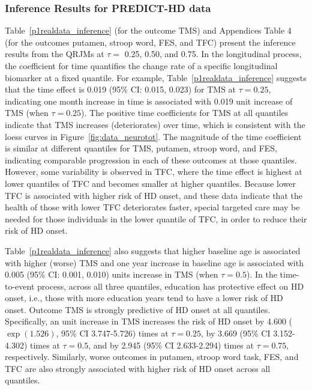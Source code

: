 \subsubsection{Inference Results for PREDICT-HD data}\label{sec:data_results}
Table~\ref{p1realdata_inference} (for the outcome TMS) and Appendices Table 4 (for the outcomes putamen, stroop word, FES, and TFC) present the inference results from the QRJMs at $\tau=$ 0.25, 0.50, and 0.75. In the longitudinal process, the coefficient for time quantifies the change rate of a specific longitudinal biomarker at a fixed quantile. For example, Table~\ref{p1realdata_inference} suggests that the time effect is 0.019 (95\% CI: 0.015, 0.023) for TMS at $\tau=0.25$, indicating one month increase in time is associated with 0.019 unit increase of TMS (when $\tau=0.25$). The positive time coefficients for TMS at all quantiles indicate that TMS increases (deteriorates) over time, which is consistent with the loess curves in Figure~\ref{fig:data_neurotot}. The magnitude of the time coefficient is similar at different quantiles for TMS, putamen, stroop word, and FES, indicating comparable progression in each of these outcomes at those quantiles. However, some variability is observed in TFC, where the time effect is highest at lower quantiles of TFC and becomes smaller at higher quantiles. Because lower TFC is associated with higher risk of HD onset, and these data indicate that the health of those with lower TFC deteriorates faster, special targeted care may be needed for those individuals in the lower quantile of TFC, in order to reduce their risk of HD onset.

Table~\ref{p1realdata_inference} also suggests that higher baseline age is associated with higher (worse) TMS and one year increase in baseline age is associated with 0.005 (95\% CI: 0.001, 0.010) units increase in TMS (when $\tau=0.5$). In the time-to-event process, across all three quantiles, education has protective effect on HD onset, i.e., those with more education years tend to have a lower risk of HD onset. Outcome TMS is strongly predictive of HD onset at all quantiles. Specifically, an unit increase in TMS increases the risk of HD onset by 4.600 ($\exp(1.526)$, 95\% CI 3.747-5.726) times at $\tau=0.25$, by 3.669 (95\% CI 3.152-4.302) times at $\tau=0.5$, and by 2.945 (95\% CI 2.633-2.294) times at $\tau=0.75$, respectively. Similarly, worse outcomes in putamen, stroop word task, FES, and TFC are also strongly associated with higher risk of HD onset across all quantiles.



